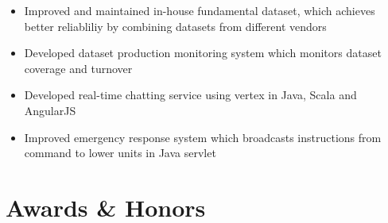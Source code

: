 \documentclass[11pt,a4paper,sans]{moderncv}        %
\begin{document}
{\begin{itemize}%
    \item Improved and maintained in-house fundamental dataset, which achieves better reliabliliy by combining datasets from different vendors
    \item Developed dataset production monitoring system which monitors dataset coverage and turnover
\end{itemize}}

{\begin{itemize}%
    \item Developed real-time chatting service using vertex in Java, Scala and AngularJS
    \item Improved emergency response system which broadcasts instructions from command to lower units in Java servlet
\end{itemize}}

\section{Awards \& Honors}

%


\clearpage
\end{document}
